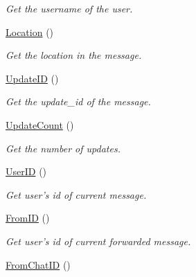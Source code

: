 \begin{DoxyCompactItemize}
\begin{DoxyCompactList}\small\item\em Get the username of the user. \end{DoxyCompactList}\item 
\hypertarget{class_telegram_aae456ae24175445c9c797b0d58d5716b}{\hyperlink{class_telegram_aae456ae24175445c9c797b0d58d5716b}{Location} ()}\label{class_telegram_aae456ae24175445c9c797b0d58d5716b}

\begin{DoxyCompactList}\small\item\em Get the location in the message. \end{DoxyCompactList}\item 
\hypertarget{class_telegram_a596f610d501cd48e6c20ec65dd9c3b34}{\hyperlink{class_telegram_a596f610d501cd48e6c20ec65dd9c3b34}{Update\-I\-D} ()}\label{class_telegram_a596f610d501cd48e6c20ec65dd9c3b34}

\begin{DoxyCompactList}\small\item\em Get the update\-\_\-id of the message. \end{DoxyCompactList}\item 
\hypertarget{class_telegram_a330b2888bb21d6c182534021a797103b}{\hyperlink{class_telegram_a330b2888bb21d6c182534021a797103b}{Update\-Count} ()}\label{class_telegram_a330b2888bb21d6c182534021a797103b}

\begin{DoxyCompactList}\small\item\em Get the number of updates. \end{DoxyCompactList}\item 
\hypertarget{class_telegram_afb1da9eb82ceca0b78cbba8e35e3fec8}{\hyperlink{class_telegram_afb1da9eb82ceca0b78cbba8e35e3fec8}{User\-I\-D} ()}\label{class_telegram_afb1da9eb82ceca0b78cbba8e35e3fec8}

\begin{DoxyCompactList}\small\item\em Get user's id of current message. \end{DoxyCompactList}\item 
\hypertarget{class_telegram_af9d816f01fd16f3ace634023f8320aad}{\hyperlink{class_telegram_af9d816f01fd16f3ace634023f8320aad}{From\-I\-D} ()}\label{class_telegram_af9d816f01fd16f3ace634023f8320aad}

\begin{DoxyCompactList}\small\item\em Get user's id of current forwarded message. \end{DoxyCompactList}\item 
\hypertarget{class_telegram_a4974bfd879b102b7bff6b69e14673b56}{\hyperlink{class_telegram_a4974bfd879b102b7bff6b69e14673b56}{From\-Chat\-I\-D} ()}\label{class_telegram_a4974bfd879b102b7bff6b69e14673b56}


\end{DoxyCompactItemize}
